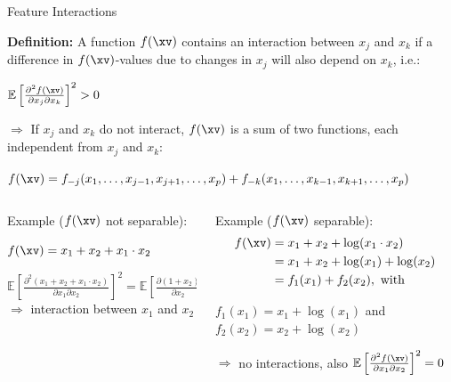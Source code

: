 \documentclass[11pt,compress,t,notes=noshow, aspectratio=169, xcolor=table]{beamer}
\begin{document}
\begin{frame}{Feature Interactions }

\textbf{Definition:} A function $f(\xv)$ contains an interaction between $x_j$ and $x_k$ if a difference in $f(\xv)$-values due to changes in $x_j$ will also depend on $x_k$, i.e.: %
\medskip
\centerline{$\mathbb{E} \left[ \frac{\partial^2 f(\xv)}{\partial x_j \partial x_k} \right]^2 > 0$}
\medskip
$\Rightarrow$ If $x_j$ and $x_k$ do not interact, $f(\xv)$ is a sum of two functions, each independent from $x_j$ and $x_k$:

\medskip

\centerline{$f(\xv) = f_{-j}(x_1, \ldots, x_{j-1}, x_{j+1}, \ldots, x_p) + f_{-k}(x_1, \ldots, x_{k-1}, x_{k+1}, \ldots, x_p)$}

\medskip\pause

\begin{columns}[T, totalwidth=\textwidth]
\begin{column}{0.52\textwidth}
Example ($f(\xv)$ not separable):
\medskip

\centerline{$f(\xv) = x_1 + x_2 + x_1 \cdot x_2$}
\medskip
$\mathbb{E} \left[ \tfrac{\partial^2 (x_1 + x_2 + x_1 \cdot x_2)}{\partial x_1 \partial x_2} \right]^2 = \mathbb{E} \left[ \tfrac{\partial (1 + x_2)}{\partial x_2} \right]^2 = 1 > 0$\\
\medskip
$\Rightarrow$ interaction between $x_1$ and $x_2$ 
\end{column}
\pause
\begin{column}{0.48\textwidth}
Example ($f(\xv)$ separable):
\setlength{\abovedisplayskip}{0pt}
\setlength{\belowdisplayskip}{0pt}
\setlength{\abovedisplayshortskip}{0pt}
\setlength{\belowdisplayshortskip}{0pt}
\medskip
\begin{align*}
	f(\xv) &= x_1 + x_2 + \log(x_1 \cdot x_2)\\
	       &= x_1 + x_2 + \log(x_1) + \log(x_2)\\
	       &= f_1(x_1) + f_2(x_2), \text{ with }
\end{align*}

\medskip

$f_1(x_1) = x_1 + \log(x_1)$ and $f_2(x_2) = x_2 + \log(x_2)$

\medskip

$\Rightarrow$ no interactions, also $\mathbb{E} \left[ \tfrac{\partial^2 f(\xv)}{\partial x_1 \partial x_2} \right]^2 = 0$
\end{column} 
\end{columns}

\end{frame}
\end{document}
